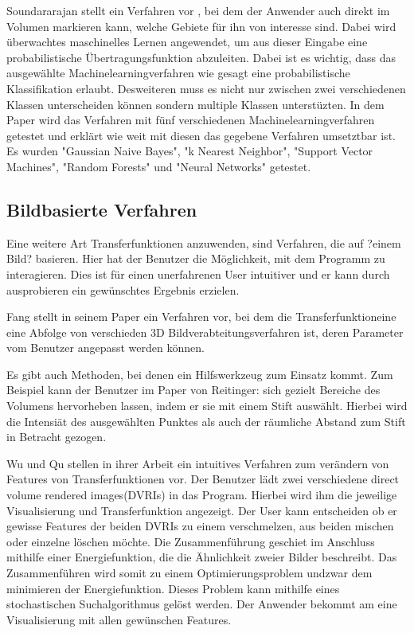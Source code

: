 Soundararajan stellt ein Verfahren vor \cite{soundararajan2015learning}, bei dem  der Anwender auch direkt im Volumen markieren kann, welche Gebiete für ihn von interesse sind.
\newline
Dabei wird überwachtes maschinelles Lernen angewendet, um aus dieser Eingabe eine probabilistische Übertragungsfunktion abzuleiten. Dabei ist es wichtig, dass das ausgewählte Machinelearningverfahren wie gesagt eine probabilistische Klassifikation erlaubt. Desweiteren muss es nicht nur zwischen zwei verschiedenen Klassen unterscheiden können sondern multiple Klassen unterstüzten.
\newline
In dem Paper wird das Verfahren mit fünf verschiedenen Machinelearningverfahren getestet und erklärt wie weit mit diesen das gegebene Verfahren umsetztbar ist. Es wurden "Gaussian Naive Bayes", "k Nearest Neighbor", "Support Vector Machines", "Random Forests" und "Neural Networks" getestet.






\subsection{Bildbasierte Verfahren}
Eine weitere Art Transferfunktionen anzuwenden, sind Verfahren, die auf ?einem Bild? basieren. Hier hat der Benutzer die Möglichkeit, mit dem Programm zu interagieren. Dies ist für einen unerfahrenen User intuitiver und er kann durch ausprobieren ein gewünschtes Ergebnis erzielen.

Fang stellt in seinem Paper \cite{fang1998image} ein Verfahren vor, bei dem die  Transferfunktioneine eine Abfolge von verschieden 3D Bildverabteitungsverfahren ist, deren Parameter vom Benutzer angepasst werden können.

Es gibt auch Methoden, bei denen ein Hilfswerkzeug zum Einsatz kommt. Zum Beispiel kann der Benutzer im Paper von Reitinger: \cite{reitinger2004user} sich gezielt Bereiche des Volumens hervorheben lassen, indem er sie mit einem Stift auswählt. Hierbei wird die Intensiät des ausgewählten Punktes als auch der räumliche Abstand zum Stift in Betracht gezogen.

Wu und Qu stellen in ihrer Arbeit \cite{wu2007interactive} ein intuitives Verfahren zum verändern von Features von Transferfunktionen vor.
\newline
Der Benutzer lädt zwei verschiedene direct volume rendered images(DVRIs) in das Program. Hierbei wird ihm die jeweilige Visualisierung und Transferfunktion angezeigt. Der User kann entscheiden ob er gewisse Features der beiden DVRIs zu einem verschmelzen, aus beiden mischen oder einzelne löschen möchte. Die Zusammenführung geschiet im Anschluss mithilfe einer Energiefunktion, die die Ähnlichkeit zweier Bilder beschreibt. Das Zusammenführen wird somit zu einem Optimierungsproblem undzwar dem minimieren der Energiefunktion. Dieses Problem kann mithilfe eines stochastischen Suchalgorithmus gelöst werden. Der Anwender bekommt am eine Visualisierung mit allen gewünschen Features.




